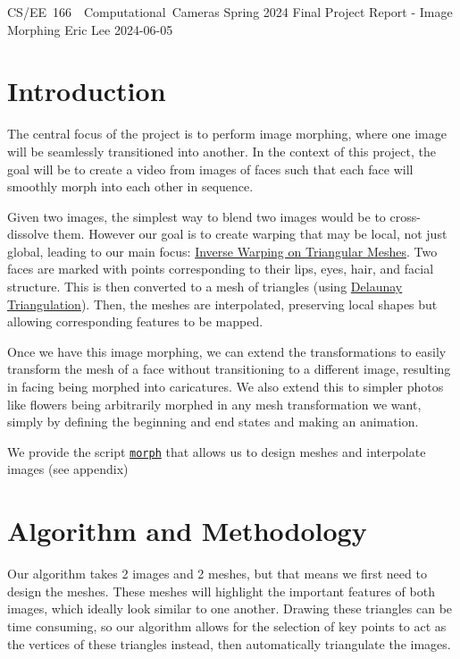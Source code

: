 \documentclass[a4paper]{article}
\begin{document}
\problemset
    {CS/EE~166~~Computational~Cameras}
    {Spring 2024}
    {Final Project Report - Image Morphing}
    {Eric Lee}
    {2024-06-05}

\section*{Introduction}

The central focus of the project is to perform image morphing, where one image will be seamlessly transitioned into another. In the context of this project, the goal will be to create a video from images of faces such that each face will smoothly morph into each other in sequence.

Given two images, the simplest way to blend two images would be to cross-dissolve them. However our goal is to create warping that may be local, not just global, leading to our main focus: \href{http://graphics.cs.cmu.edu/courses/15-463/2007_fall/Lectures/morphing.pdf}{Inverse Warping on Triangular Meshes}. Two faces are marked with points corresponding to their lips, eyes, hair, and facial structure. This is then converted to a mesh of triangles (using \href{https://en.wikipedia.org/wiki/Delaunay_triangulation}{Delaunay Triangulation}). Then, the meshes are interpolated, preserving local shapes but allowing corresponding features to be mapped.

Once we have this image morphing, we can extend the transformations to easily transform the mesh of a face without transitioning to a different image, resulting in facing being morphed into caricatures. We also extend this to simpler photos like flowers being arbitrarily morphed in any mesh transformation we want, simply by defining the beginning and end states and making an animation.

We provide the script \href{https://github.com/ericlovesmath/image-morphing/tree/main}{\texttt{morph}} that allows us to design meshes and interpolate images (see appendix)

\section*{Algorithm and Methodology}

Our algorithm takes 2 images and 2 meshes, but that means we first need to design the meshes. These meshes will highlight the important features of both images, which ideally look similar to one another. Drawing these triangles can be time consuming, so our algorithm allows for the selection of key points to act as the vertices of these triangles instead, then automatically triangulate the images.
\end{document}
